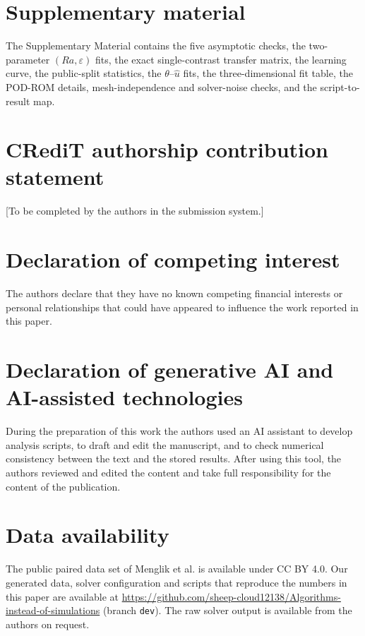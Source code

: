 \documentclass[preprint,11pt,a4paper,times,doubleblind]{elsarticle}
\begin{document}
\section*{Supplementary material}

The Supplementary Material contains the five asymptotic checks, the two-parameter
$(Ra,\varepsilon)$ fits, the exact single-contrast transfer matrix, the learning curve, the
public-split statistics, the $\theta$--$\hat u$ fits, the three-dimensional fit table, the
POD-ROM details, mesh-independence and solver-noise checks, and the script-to-result map.

\section*{CRediT authorship contribution statement}

[To be completed by the authors in the submission system.]

\section*{Declaration of competing interest}

The authors declare that they have no known competing financial interests or personal
relationships that could have appeared to influence the work reported in this paper.

\section*{Declaration of generative AI and AI-assisted technologies}

During the preparation of this work the authors used an AI assistant to develop analysis
scripts, to draft and edit the manuscript, and to check numerical consistency between the text
and the stored results. After using this tool, the authors reviewed and edited the content and
take full responsibility for the content of the publication.

\section*{Data availability}

\begin{sloppypar}
The public paired data set of Menglik et al. \citep{menglik2026neural} is available under CC BY 4.0. Our
generated data, solver configuration and scripts that reproduce the numbers in this paper are
available at
\url{https://github.com/sheep-cloud12138/Algorithms-instead-of-simulations} (branch \texttt{dev}).
The raw solver output is available from the authors on request.
\end{sloppypar}



\end{document}

